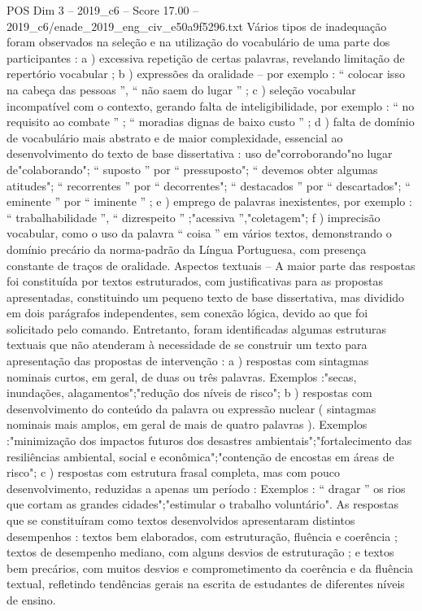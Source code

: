 \begin{textsample}{POS Dim 3 – 2019\_c6 – Score 17.00 – 2019\_c6/enade\_2019\_eng\_civ\_e50a9f5296.txt}
Vários tipos de inadequação foram observados na seleção e na utilização do vocabulário de uma parte dos participantes : a ) excessiva repetição de certas palavras, revelando limitação de repertório vocabular ; b ) expressões da oralidade – por exemplo : “ colocar isso na cabeça das pessoas ”, “ não saem do lugar ” ; c ) seleção vocabular incompatível com o contexto, gerando falta de inteligibilidade, por exemplo : “ no requisito ao combate ” ; “ moradias dignas de baixo custo ” ; d ) falta de domínio de vocabulário mais abstrato e de maior complexidade, essencial ao desenvolvimento do texto de base dissertativa : uso de"corroborando"no lugar de"colaborando"; “ suposto ” por “ pressuposto"; “ devemos obter algumas atitudes"; “ recorrentes ” por “ decorrentes"; “ destacados ” por “ descartados"; “ eminente ” por “ iminente ” ; e ) emprego de palavras inexistentes, por exemplo : “ trabalhabilidade ”, “ dizrespeito ” ;"acessiva ”,"coletagem"; f ) imprecisão vocabular, como o uso da palavra “ coisa ” em vários textos, demonstrando o domínio precário da norma-padrão da Língua Portuguesa, com presença constante de traços de oralidade.
Aspectos textuais – A maior parte das respostas foi constituída por textos estruturados, com justificativas para as propostas apresentadas, constituindo um pequeno texto de base dissertativa, mas dividido em dois parágrafos independentes, sem conexão lógica, devido ao que foi solicitado pelo comando.
Entretanto, foram identificadas algumas estruturas textuais que não atenderam à necessidade de se construir um texto para apresentação das propostas de intervenção : a ) respostas com sintagmas nominais curtos, em geral, de duas ou três palavras.
Exemplos :"secas, inundações, alagamentos";"redução dos níveis de risco"; b ) respostas com desenvolvimento do conteúdo da palavra ou expressão nuclear ( sintagmas nominais mais amplos, em geral de mais de quatro palavras ).
Exemplos :"minimização dos impactos futuros dos desastres ambientais";"fortalecimento das resiliências ambiental, social e econômica";"contenção de encostas em áreas de risco"; c ) respostas com estrutura frasal completa, mas com pouco desenvolvimento, reduzidas a apenas um período : Exemplos : “ dragar ” os rios que cortam as grandes cidades";"estimular o trabalho voluntário".
As respostas que se constituíram como textos desenvolvidos apresentaram distintos desempenhos : textos bem elaborados, com estruturação, fluência e coerência ; textos de desempenho mediano, com alguns desvios de estruturação ; e textos bem precários, com muitos desvios e comprometimento da coerência e da fluência textual, refletindo tendências gerais na escrita de estudantes de diferentes níveis de ensino.

\end{textsample}
